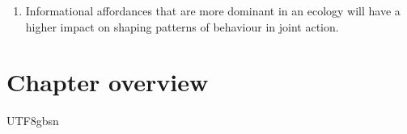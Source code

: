 \begin{CJK}{UTF8}{gbsn}
\begin{enumerate}
  \item Informational affordances that are more dominant in an ecology will have a higher impact on shaping patterns of behaviour in joint action.

\end{enumerate}








\section{Chapter overview}


                                              \end{CJK}{UTF8}{gbsn}
